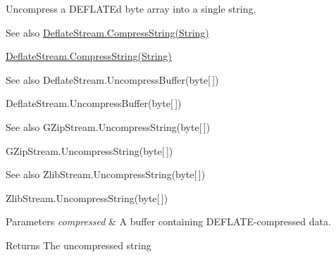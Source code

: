 Uncompress a D\+E\+F\+L\+A\+TE\textquotesingle{}d byte array into a single string. 

\begin{DoxySeeAlso}{See also}
\mbox{\hyperlink{class_super_tiled2_unity_1_1_ionic_1_1_zlib_1_1_deflate_stream_a65c35073943a8f21f85c0afddf4f8874}{Deflate\+Stream.\+Compress\+String(\+String)}}


\end{DoxySeeAlso}
\mbox{\hyperlink{class_super_tiled2_unity_1_1_ionic_1_1_zlib_1_1_deflate_stream_a65c35073943a8f21f85c0afddf4f8874}{Deflate\+Stream.\+Compress\+String(\+String)}}

\begin{DoxySeeAlso}{See also}
Deflate\+Stream.\+Uncompress\+Buffer(byte\mbox{[}$\,$\mbox{]})


\end{DoxySeeAlso}
Deflate\+Stream.\+Uncompress\+Buffer(byte\mbox{[}$\,$\mbox{]})

\begin{DoxySeeAlso}{See also}
G\+Zip\+Stream.\+Uncompress\+String(byte\mbox{[}$\,$\mbox{]})


\end{DoxySeeAlso}
G\+Zip\+Stream.\+Uncompress\+String(byte\mbox{[}$\,$\mbox{]})

\begin{DoxySeeAlso}{See also}
Zlib\+Stream.\+Uncompress\+String(byte\mbox{[}$\,$\mbox{]})


\end{DoxySeeAlso}
Zlib\+Stream.\+Uncompress\+String(byte\mbox{[}$\,$\mbox{]})


\begin{DoxyParams}{Parameters}
{\em compressed} & A buffer containing D\+E\+F\+L\+A\+T\+E-\/compressed data. \\
\hline
\end{DoxyParams}


\begin{DoxyReturn}{Returns}
The uncompressed string
\end{DoxyReturn}
\mbox{\label{class_super_tiled2_unity_1_1_ionic_1_1_zlib_1_1_deflate_stream_a751d2c556423679f9267bc2a45ce3539}} 
